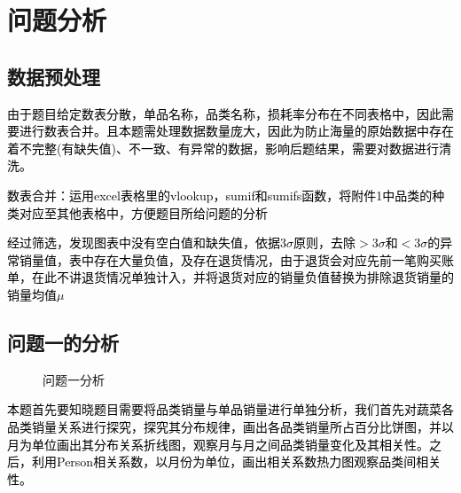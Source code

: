 \documentclass[withoutpreface,bwprint]{cumcmthesis}
\begin{document}

\section{问题分析}
\subsection{数据预处理}
 \textcolor{black}{\normalsize 由于题目给定数表分散，单品名称，品类名称，损耗率分布在不同表格中，因此需要进行数表合并。且本题需处理数据数量庞大，因此为防止海量的原始数据中存在着不完整(有缺失值)、不一致、有异常的数据，影响后题结果，需要对数据进行清洗。}
 
 \textcolor{black}{\normalsize 数表合并：运用excel表格里的vlookup，sumif和sumifs函数，将附件1中品类的种类对应至其他表格中，方便题目所给问题的分析} 
 
  \textcolor{black}{​\normalsize 经过筛选，发现图表中没有空白值和缺失值，依据$3\sigma$原则，去除$>3\sigma$和$<3\sigma$的异常销量值，表中存在大量负值，及存在退货情况，由于退货会对应先前一笔购买账单，在此不讲退货情况单独计入，并将退货对应的销量负值替换为排除退货销量的销量均值$\mu$} 
\subsection{问题一的分析}
\begin{figure}[htb!]
	\centering
{}
	\caption{问题一分析}
	\label{fig:m2}
\end{figure}
\textcolor{black}{\normalsize 本题首先要知晓题目需要将品类销量与单品销量进行单独分析，我们首先对蔬菜各品类销量关系进行探究，探究其分布规律，画出各品类销量所占百分比饼图，并以月为单位画出其分布关系折线图，观察月与月之间品类销量变化及其相关性。之后，利用Person相关系数，以月份为单位，画出相关系数热力图观察品类间相关性。}
\end{document}
